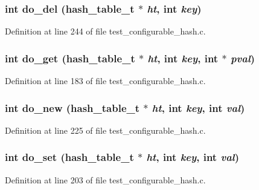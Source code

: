 \subsubsection[{do\_\-del}]{\setlength{\rightskip}{0pt plus 5cm}int do\_\-del (hash\_\-table\_\-t $\ast$ {\em ht}, \/  int {\em key})}\label{test__configurable__hash_8c_ec7e06cf1eb3d581149a1f9f9efa989f}




Definition at line 244 of file test\_\-configurable\_\-hash.c.
\subsubsection[{do\_\-get}]{\setlength{\rightskip}{0pt plus 5cm}int do\_\-get (hash\_\-table\_\-t $\ast$ {\em ht}, \/  int {\em key}, \/  int $\ast$ {\em pval})}\label{test__configurable__hash_8c_3bffceb3f720af7648080322f59db3a6}




Definition at line 183 of file test\_\-configurable\_\-hash.c.
\subsubsection[{do\_\-new}]{\setlength{\rightskip}{0pt plus 5cm}int do\_\-new (hash\_\-table\_\-t $\ast$ {\em ht}, \/  int {\em key}, \/  int {\em val})}\label{test__configurable__hash_8c_cf576a787ddf26b8190fa8dcf589ba81}




Definition at line 225 of file test\_\-configurable\_\-hash.c.
\subsubsection[{do\_\-set}]{\setlength{\rightskip}{0pt plus 5cm}int do\_\-set (hash\_\-table\_\-t $\ast$ {\em ht}, \/  int {\em key}, \/  int {\em val})}\label{test__configurable__hash_8c_20e86e8b8ecadf6a9b33b9a17287699a}




Definition at line 203 of file test\_\-configurable\_\-hash.c.
